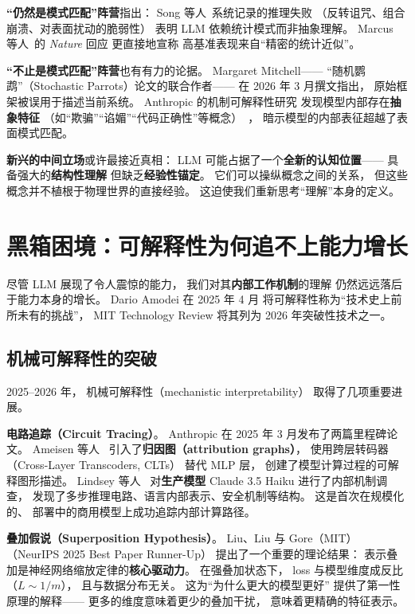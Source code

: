 \textbf{``仍然是模式匹配''阵营}指出：
Song 等人~\cite{song2026reasoning}系统记录的推理失败
（反转诅咒、组合崩溃、对表面扰动的脆弱性）
表明 LLM 依赖统计模式而非抽象理解。
Marcus 等人~\cite{marcus2026nature}的 \textit{Nature} 回应
更直接地宣称
高基准表现来自``精密的统计近似''。

\textbf{``不止是模式匹配''阵营}也有有力的论据。
Margaret Mitchell——
``随机鹦鹉''（Stochastic Parrots）论文的联合作者——
在 2026 年 3 月撰文指出，
原始框架被误用于描述当前系统。
Anthropic 的机制可解释性研究
发现模型内部存在\textbf{抽象特征}
（如``欺骗''``谄媚''``代码正确性''等概念）~\cite{lindsey2025biology}，
暗示模型的内部表征超越了表面模式匹配。

\textbf{新兴的中间立场}或许最接近真相：
LLM 可能占据了一个\textbf{全新的认知位置}——
具备强大的\textbf{结构性理解}
但缺乏\textbf{经验性锚定}。
它们可以操纵概念之间的关系，
但这些概念并不植根于物理世界的直接经验。
这迫使我们重新思考``理解''本身的定义。


\section{黑箱困境：可解释性为何追不上能力增长}
\label{sec:interpretability}

尽管 LLM 展现了令人震惊的能力，
我们对其\textbf{内部工作机制}的理解
仍然远远落后于能力本身的增长。
Dario Amodei 在 2025 年 4 月
将可解释性称为``技术史上前所未有的挑战''，
MIT Technology Review 将其列为 2026 年突破性技术之一。

\subsection{机械可解释性的突破}

2025--2026 年，
机械可解释性（mechanistic interpretability）
取得了几项重要进展。

\textbf{电路追踪（Circuit Tracing）}。
Anthropic 在 2025 年 3 月发布了两篇里程碑论文。
Ameisen 等人~\cite{ameisen2025circuits}
引入了\textbf{归因图（attribution graphs）}，
使用跨层转码器（Cross-Layer Transcoders, CLTs）
替代 MLP 层，
创建了模型计算过程的可解释图形描述。
Lindsey 等人~\cite{lindsey2025biology}
对\textbf{生产模型} Claude 3.5 Haiku 进行了内部机制调查，
发现了多步推理电路、语言内部表示、安全机制等结构。
这是首次在规模化的、
部署中的商用模型上成功追踪内部计算路径。

\textbf{叠加假说（Superposition Hypothesis）}。
Liu、Liu 与 Gore（MIT）~\cite{liu2025superposition}
（NeurIPS 2025 Best Paper Runner-Up）
提出了一个重要的理论结果：
表示叠加是神经网络缩放定律的\textbf{核心驱动力}。
在强叠加状态下，
loss 与模型维度成反比（$L \sim 1/m$），
且与数据分布无关。
这为``为什么更大的模型更好''
提供了第一性原理的解释——
更多的维度意味着更少的叠加干扰，
意味着更精确的特征表示。

